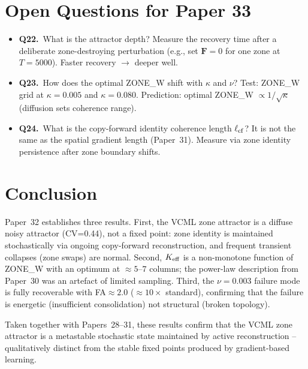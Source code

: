 \documentclass[11pt,a4paper]{article}
\begin{document}
\section{Open Questions for Paper 33}
\label{sec:openq}

\begin{itemize}
  \item \textbf{Q22.}\ What is the attractor depth?  Measure the recovery time after a
    deliberate zone-destroying perturbation (e.g., set $\mathbf{F}=0$ for one zone at
    $T=5000$).  Faster recovery $\to$ deeper well.
  \item \textbf{Q23.}\ How does the optimal ZONE\_W shift with $\kappa$ and $\nu$?
    Test: ZONE\_W grid at $\kappa=0.005$ and $\kappa=0.080$.
    Prediction: optimal ZONE\_W $\propto 1/\sqrt{\kappa}$ (diffusion sets coherence range).
  \item \textbf{Q24.}\ What is the copy-forward identity coherence length $\ell_{\rm cf}$?
    It is not the same as the spatial gradient length (Paper~31).  Measure via zone
    identity persistence after zone boundary shifts.
\end{itemize}

\section{Conclusion}
\label{sec:conclusion}

Paper~32 establishes three results.  First, the VCML zone attractor is a diffuse noisy
attractor (CV=0.44), not a fixed point: zone identity is maintained stochastically via
ongoing copy-forward reconstruction, and frequent transient collapses (zone swaps)
are normal.  Second, $K_{\rm eff}$ is a non-monotone function of ZONE\_W with an
optimum at $\approx 5$--$7$ columns; the power-law description from Paper~30 was an
artefact of limited sampling.  Third, the $\nu=0.003$ failure mode is fully recoverable
with FA$\approx 2.0$ ($\approx10\times$ standard), confirming that the failure is
energetic (insufficient consolidation) not structural (broken topology).

Taken together with Papers~28--31, these results confirm that the VCML zone attractor
is a metastable stochastic state maintained by active reconstruction -- qualitatively
distinct from the stable fixed points produced by gradient-based learning.
\end{document}
